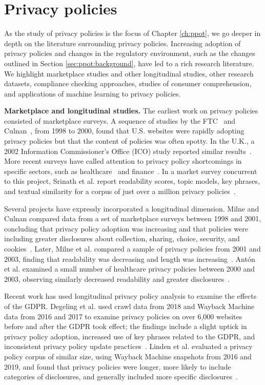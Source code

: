 \section{Privacy policies}
\label{sec:ppot:related}

As the study of privacy policies is the focus of Chapter \ref{ch:ppot}, we go deeper in depth on the literature surrounding privacy policies. Increasing adoption of privacy policies and changes in the regulatory environment, such as the changes outlined in Section \ref{sec:ppot:background}, have led to a rich research literature. We highlight marketplace studies and other longitudinal studies, other research datasets, compliance checking approaches, studies of consumer comprehension, and applications of machine learning to privacy policies.

\textbf{Marketplace and longitudinal studies.}
The earliest work on privacy policies consisted of marketplace surveys. A sequence of studies by the FTC~\cite{ftc-privacy-survey1998, ftc-privacy-survey2000} and Culnan~\cite{culnan2000protecting}, from 1998 to 2000, found that U.S. websites were rapidly adopting privacy policies but that the content of policies was often spotty. In the U.K., a 2002 Information Commissioner's Office (ICO) study reported similar results~\cite{ico-survey2002}. More recent surveys have called attention to privacy policy shortcomings in specific sectors, such as healthcare~\cite{sunyaev15} and finance~\cite{bowers2017}. In a market survey concurrent to this project, Srinath et al. report readability scores, topic models, key phrases, and textual similarity for a corpus of just over a million privacy policies~\cite{srinath2020}.

Several projects have expressly incorporated a longitudinal dimension. Milne and Culnan compared data from a set of marketplace surveys between 1998 and 2001, concluding that privacy policy adoption was increasing and that policies were including greater disclosures about collection, sharing, choice, security, and cookies~\cite{milne2002}. Later, Milne et al. compared a sample of privacy policies from 2001 and 2003, finding that readability was decreasing and length was increasing~\cite{milne2006longitudinal}. Antón et al. examined a small number of healthcare privacy policies between 2000 and 2003, observing similarly decreased readability and greater disclosures~\cite{anton2007hipaa}.

Recent work has used longitudinal privacy policy analysis to examine the effects of the GDPR. Degeling et al. used crawl data from 2018 and Wayback Machine data from 2016 and 2017 to examine privacy policies on over 6,000 websites before and after the GDPR took effect; the findings include a slight uptick in privacy policy adoption, increased use of key phrases related to the GDPR, and inconsistent privacy policy update practices~\cite{degeling2018we}. Linden et al. evaluated a privacy policy corpus of similar size, using Wayback Machine snapshots from 2016 and 2019, and found that privacy policies were longer, more likely to include categories of disclosures, and generally included more specific disclosures~\cite{linden2020privacy}.

